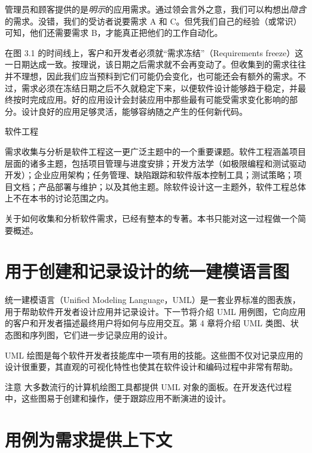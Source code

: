 管理员和顾客提供的是\emph{明示}的应用需求。通过领会言外之意，我们可以构想出\emph{隐含}的需求。没错，我们的受访者说要需求 A 和 C。但凭我们自己的经验（或常识）可知，他们还需要需求 B，才能真正把他们的工作自动化。

在图 3.1 的时间线上，客户和开发者必须就“需求冻结”（Requirements freeze）这一日期达成一致。按理说，该日期之后需求就不会再变动了。但收集到的需求往往并不理想，因此我们应当预料到它们可能仍会变化，也可能还会有额外的需求。不过，需求必须在冻结日期之后不久就稳定下来，以便软件设计能够趋于稳定，并最终按时完成应用。好的应用设计会封装应用中那些最有可能受需求变化影响的部分。设计良好的应用足够灵活，能够容纳随之产生的任何新代码。


\begin{mySidebar}{软件工程}

需求收集与分析是软件工程这一更广泛主题中的一个重要课题。软件工程涵盖项目层面的诸多主题，包括项目管理与进度安排；开发方法学（如极限编程和测试驱动开发）；企业应用架构；任务管理、缺陷跟踪和软件版本控制工具；测试策略；项目文档；产品部署与维护；以及其他主题。除软件设计这一主题外，软件工程总体上不在本书的讨论范围之内。

关于如何收集和分析软件需求，已经有整本的专著。本书只能对这一过程做一个简要概述。
\end{mySidebar}

\section{用于创建和记录设计的统一建模语言图}

统一建模语言（Unified Modeling Language，UML）是一套业界标准的图表族，用于帮助软件开发者设计应用并记录设计。下一节将介绍 UML 用例图，它向应用的客户和开发者描述最终用户将如何与应用交互。第 4 章将介绍 UML 类图、状态图和序列图，它们进一步记录应用的设计。

UML 绘图是每个软件开发者技能库中一项有用的技能。这些图不仅对记录应用的设计很重要，其直观的可视化特性也使其在软件设计和编码过程中非常有帮助。

\begin{myWarning}{注意}
大多数流行的计算机绘图工具都提供 UML 对象的面板。在开发迭代过程中，这些图易于创建和操作，便于跟踪应用不断演进的设计。
\end{myWarning}

\section{用例为需求提供上下文}

